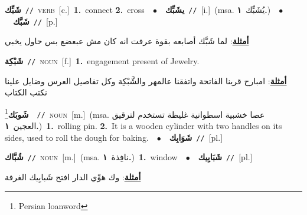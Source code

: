 \documentclass[10pt,a4paper,twoside]{article} %
\begin{document}
\begin{multicols}{2}
{{{{{{{{{{{{\setlength\topsep{0pt}\textbf{\foreignlanguage{arabic}{شَبِّك}}\ {\color{gray}\texttt{//}\color{black}}\ \textsc{verb}\ [c.]\ \textbf{1.}~connect  \textbf{2.}~cross\ \ $\bullet$\ \ \setlength\topsep{0pt}\textbf{\foreignlanguage{arabic}{يشَبِّك}}\ {\color{gray}\texttt{//}\color{black}}\ [i.]\ \color{gray}(msa. \foreignlanguage{arabic}{يُشَبِّك}~\foreignlanguage{arabic}{\textbf{١.}})\color{black}\ \ $\bullet$\ \ \setlength\topsep{0pt}\textbf{\foreignlanguage{arabic}{شَبَّك}}\ {\color{gray}\texttt{//}\color{black}}\ [p.]\  \begin{flushright}\color{gray}\foreignlanguage{arabic}{\textbf{\underline{\foreignlanguage{arabic}{أمثلة}}}: لما شَبَّك أصابعه بقوة عرفت انه كان مش عبعضع بس حاول يخبي}\end{flushright}\color{black}} \vspace{2mm}

{\setlength\topsep{0pt}\textbf{\foreignlanguage{arabic}{شَبْكِة}}\ {\color{gray}\texttt{//}\color{black}}\ \textsc{noun}\ [f.]\ \textbf{1.}~engagement present of Jewelry.\  \begin{flushright}\color{gray}\foreignlanguage{arabic}{\textbf{\underline{\foreignlanguage{arabic}{أمثلة}}}: امبارح قرينا الفاتحة واتفقنا عالمهر والشَّبْكِة وكل تفاصيل العرس وضايل علينا نكتب الكتاب}\end{flushright}\color{black}} \vspace{2mm}

{\setlength\topsep{0pt}\textbf{\foreignlanguage{arabic}{شَوبَك}}\footnote{Persian loanword}\ \ {\color{gray}\texttt{//}\color{black}}\ \textsc{noun}\ [m.]\ \color{gray}(msa. \foreignlanguage{arabic}{عصا خشبية اسطوانية غليظة تستخدم لترقيق العجين}~\foreignlanguage{arabic}{\textbf{١.}})\color{black}\ \textbf{1.}~rolling pin.  \textbf{2.}~It is a wooden cylinder with two handles on its sides, used to roll the dough for baking.\ \ $\bullet$\ \ \setlength\topsep{0pt}\textbf{\foreignlanguage{arabic}{شَوَابِك}}\ {\color{gray}\texttt{//}\color{black}}\ [pl.]\ 

{\setlength\topsep{0pt}\textbf{\foreignlanguage{arabic}{شُبَّاك}}\ {\color{gray}\texttt{//}\color{black}}\ \textsc{noun}\ [m.]\ \color{gray}(msa. \foreignlanguage{arabic}{نافِذة}~\foreignlanguage{arabic}{\textbf{١.}})\color{black}\ \textbf{1.}~window\ \ $\bullet$\ \ \setlength\topsep{0pt}\textbf{\foreignlanguage{arabic}{شَبَابِيك}}\ {\color{gray}\texttt{//}\color{black}}\ [pl.]\  \begin{flushright}\color{gray}\foreignlanguage{arabic}{\textbf{\underline{\foreignlanguage{arabic}{أمثلة}}}: وك هوِّي الدار افتح شَبابِيك الغرفة}\end{flushright}\color{black}} \vspace{2mm}

}}}}}}}}}}}}
\end{multicols}
\end{document}
